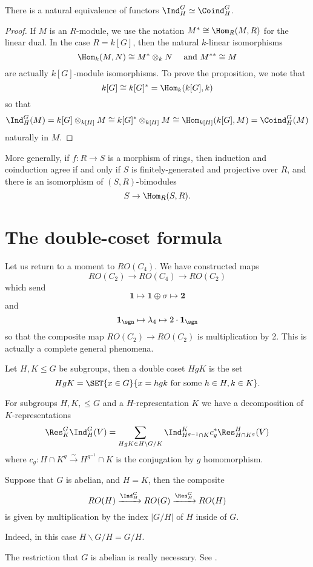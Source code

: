 \documentclass{willowtreebook}
\begin{document}
    \begin{proposition}
        There is a natural equivalence of functors $\Ind_H^G \simeq \Coind_H^G$. 
    \end{proposition}
    \begin{proof}
      If $M$ is an $R$-module, we use the notation $M^* \cong \Hom_R(M,R)$ for the linear dual. In the case $R = k[G]$, then the natural $k$-linear isomorphisms
      \[
      \Hom_k(M,N) \cong M^* \otimes_kN \quad \text{ and } M^{**} \cong M
      \]
      are actually $k[G]$-module isomorphisms. To prove the proposition, we note that
      \[
      k[G] \cong k[G]^* = \Hom_k(k[G],k)
      \]
      so that
      \[
      \Ind_H^G(M) = k[G] \otimes_{k[H]} M \cong k[G]^* \otimes_{k[H]}M \cong \Hom_{k[H]}(k[G],M) = \Coind_H^G(M)
      \]
      naturally in $M$. 
    \end{proof}
\begin{remark}
    More generally, if $f \colon R \to S$ is a morphism of rings, then induction and coinduction agree if and only if $S$ is finitely-generated and projective over $R$, and there is an isomorphism of $(S,R)$-bimodules
    \[
    S \to \Hom_R(S,R).
    \]
\end{remark}
\section{The double-coset formula}
Let us return to a moment to $RO(C_4)$. We have constructed maps
\[
RO(C_2) \to RO(C_4) \to RO(C_2)
\]
which send
\[
\mathbf{1} \mapsto \mathbf{1}\oplus \sigma \mapsto \mathbf{2}
\]
and
\[
\mathbf{1}_{\sgn} \mapsto \lambda_4 \mapsto 2 \cdot \mathbf{1}_{\sgn}
\]
so that the composite map $RO(C_2) \to RO(C_2)$ is multiplication by 2. This is actually a complete general phenomena. 
\begin{definition}
    Let $H,K \le G$ be subgroups, then a double coset $HgK$ is the set
    \[
    HgK = \SET{x \in G}{x = hgk \text{ for some } h \in H,k \in K}.
    \]
\end{definition}
\begin{theorem}
For subgroups $H,K,\le G$ and a $H$-representation $K$ we have a decomposition of $K$-representations
\[
\Res^G_K\Ind_H^G(V) = \sum_{HgK \in H \backslash G/K} \Ind_{H^{g-1} \cap K}^{K} c_g^*\Res^H_{H \cap K^g}(V)
\]
where $c_g \colon H \cap K^g \xrightarrow{\sim}H^{g^{-1}}\cap K$ is the conjugation by $g$ homomorphism. 
\end{theorem}
\begin{corollary}
    Suppose that $G$ is abelian, and $H = K$, then the composite 
    \[
    RO(H) \xrightarrow{\Ind_H^G} RO(G) \xrightarrow{\Res^G_H} RO(H)
    \]
    is given by multiplication by the index $|G/H|$ of $H$ inside of $G$. 
\end{corollary}
Indeed, in this case $H\backslash G/H = G/H$. 
\begin{remark}
    The restriction that $G$ is abelian is really necessary. See \cite[Example 1.1.51]{guillou}. 
\end{remark}
\end{document}
